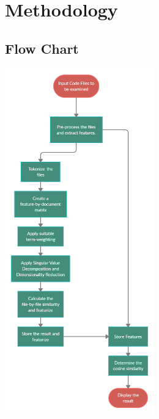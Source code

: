 \documentclass[12pt]{article}
\begin{document}

\section{Methodology}
\subsection{Flow Chart}
\includegraphics[height=15cm]{flow.png}
\end{document}
